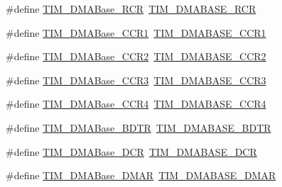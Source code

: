 \begin{DoxyCompactItemize}
\item 
\#define \hyperlink{group___h_a_l___t_i_m___aliased___defines_ga97f9edceee5c99b32aaa2c6daf849b7d}{T\+I\+M\+\_\+\+D\+M\+A\+Base\+\_\+\+R\+CR}~\hyperlink{group___t_i_m___d_m_a___base__address_gac26cff34f1d207798b946c01a40f5d89}{T\+I\+M\+\_\+\+D\+M\+A\+B\+A\+S\+E\+\_\+\+R\+CR}
\item 
\#define \hyperlink{group___h_a_l___t_i_m___aliased___defines_ga235a47fa47fd19594a111e6e48c0d5a2}{T\+I\+M\+\_\+\+D\+M\+A\+Base\+\_\+\+C\+C\+R1}~\hyperlink{group___t_i_m___d_m_a___base__address_ga2d1bc7e5ae83b91caa352276d15142dc}{T\+I\+M\+\_\+\+D\+M\+A\+B\+A\+S\+E\+\_\+\+C\+C\+R1}
\item 
\#define \hyperlink{group___h_a_l___t_i_m___aliased___defines_ga0e2150dcd3afe31ecb793aa471b3b972}{T\+I\+M\+\_\+\+D\+M\+A\+Base\+\_\+\+C\+C\+R2}~\hyperlink{group___t_i_m___d_m_a___base__address_ga0c73e7e1fa212ab14a43ca49e9d8850e}{T\+I\+M\+\_\+\+D\+M\+A\+B\+A\+S\+E\+\_\+\+C\+C\+R2}
\item 
\#define \hyperlink{group___h_a_l___t_i_m___aliased___defines_ga590c90085bd2b206b941dff2731fed74}{T\+I\+M\+\_\+\+D\+M\+A\+Base\+\_\+\+C\+C\+R3}~\hyperlink{group___t_i_m___d_m_a___base__address_gae3c259f405c78e31411c19195eac48bc}{T\+I\+M\+\_\+\+D\+M\+A\+B\+A\+S\+E\+\_\+\+C\+C\+R3}
\item 
\#define \hyperlink{group___h_a_l___t_i_m___aliased___defines_ga5e84a16e7d8ea369a3a55bb6fe1f2171}{T\+I\+M\+\_\+\+D\+M\+A\+Base\+\_\+\+C\+C\+R4}~\hyperlink{group___t_i_m___d_m_a___base__address_gaea24fd3f528163da065cbdce3c68ef23}{T\+I\+M\+\_\+\+D\+M\+A\+B\+A\+S\+E\+\_\+\+C\+C\+R4}
\item 
\#define \hyperlink{group___h_a_l___t_i_m___aliased___defines_gaaff22bbf3091c47783c1c68b648c8605}{T\+I\+M\+\_\+\+D\+M\+A\+Base\+\_\+\+B\+D\+TR}~\hyperlink{group___t_i_m___d_m_a___base__address_ga767eab033d485d32de80b46f70be3341}{T\+I\+M\+\_\+\+D\+M\+A\+B\+A\+S\+E\+\_\+\+B\+D\+TR}
\item 
\#define \hyperlink{group___h_a_l___t_i_m___aliased___defines_ga59e2206e4e03b9d55c9fb5a24e29b01c}{T\+I\+M\+\_\+\+D\+M\+A\+Base\+\_\+\+D\+CR}~\hyperlink{group___t_i_m___d_m_a___base__address_gab3e5aaf0cb815b4a2469d3046eca0201}{T\+I\+M\+\_\+\+D\+M\+A\+B\+A\+S\+E\+\_\+\+D\+CR}
\item 
\#define \hyperlink{group___h_a_l___t_i_m___aliased___defines_gaf2b823d37e722f9f856c654fa35eff26}{T\+I\+M\+\_\+\+D\+M\+A\+Base\+\_\+\+D\+M\+AR}~\hyperlink{group___t_i_m___d_m_a___base__address_gafc79c60f0295d440ba3ed3bb3c73c739}{T\+I\+M\+\_\+\+D\+M\+A\+B\+A\+S\+E\+\_\+\+D\+M\+AR}

\end{DoxyCompactItemize}
